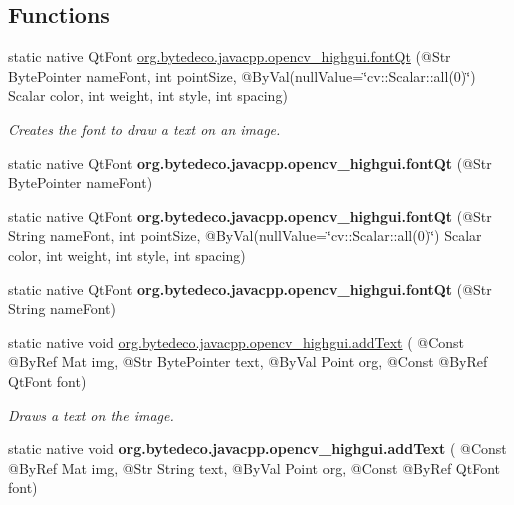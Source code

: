 \subsection*{Functions}
\begin{DoxyCompactItemize}
\item 
static native Qt\+Font \hyperlink{group__highgui__qt_gaee437fe91204f6d6d9016c6a7b78850d}{org.\+bytedeco.\+javacpp.\+opencv\+\_\+highgui.\+font\+Qt} (@Str Byte\+Pointer name\+Font, int point\+Size, @By\+Val(null\+Value=\char`\"{}cv\+::\+Scalar\+::all(0)\char`\"{}) Scalar color, int weight, int style, int spacing)
\begin{DoxyCompactList}\small\item\em Creates the font to draw a text on an image. \end{DoxyCompactList}\item 
\mbox{\label{group__highgui__qt_gaf9e2c05403b923a4906cd83c2051a641}} 
static native Qt\+Font {\bfseries org.\+bytedeco.\+javacpp.\+opencv\+\_\+highgui.\+font\+Qt} (@Str Byte\+Pointer name\+Font)
\item 
\mbox{\label{group__highgui__qt_gaffe37a1adb6064e41ebd583585d32e87}} 
static native Qt\+Font {\bfseries org.\+bytedeco.\+javacpp.\+opencv\+\_\+highgui.\+font\+Qt} (@Str String name\+Font, int point\+Size, @By\+Val(null\+Value=\char`\"{}cv\+::\+Scalar\+::all(0)\char`\"{}) Scalar color, int weight, int style, int spacing)
\item 
\mbox{\label{group__highgui__qt_ga83777e04ba7f2e58cf5dd46e998fc020}} 
static native Qt\+Font {\bfseries org.\+bytedeco.\+javacpp.\+opencv\+\_\+highgui.\+font\+Qt} (@Str String name\+Font)
\item 
static native void \hyperlink{group__highgui__qt_gaccc5f5d89abe18bc7adfd650dccb265f}{org.\+bytedeco.\+javacpp.\+opencv\+\_\+highgui.\+add\+Text} ( @Const @By\+Ref Mat img, @Str Byte\+Pointer text, @By\+Val Point org, @Const @By\+Ref Qt\+Font font)
\begin{DoxyCompactList}\small\item\em Draws a text on the image. \end{DoxyCompactList}\item 
\mbox{\label{group__highgui__qt_ga0722ac34d2ff69c3ccca326f56090870}} 
static native void {\bfseries org.\+bytedeco.\+javacpp.\+opencv\+\_\+highgui.\+add\+Text} ( @Const @By\+Ref Mat img, @Str String text, @By\+Val Point org, @Const @By\+Ref Qt\+Font font)

\end{DoxyCompactItemize}

